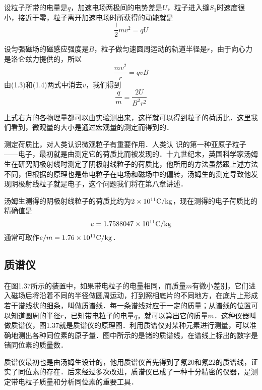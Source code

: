 设粒子所带的电量是$q$，加速电场两极间的电势差是$U$，粒子进入缝$S_1$时速度很小，接近于零，粒子离开加速电场时所获得的动能就是
\begin{equation}
\frac{1}{2}mv^2=qU    
\end{equation}

设匀强磁场的磁感应强度是$B$，粒子做匀速圆周运动的轨道半径是$r$，由于向心力是洛仑兹力提供的，所以
\begin{equation}
    \frac{mv^2}{r}=qvB
\end{equation}
由(1.3)和(1.4)两式中消去$v$，我们得到
\[\frac{q}{m}=\frac{2U}{B^2r^2}\]

上式右方的各物理量都可以由实验测出来，这样就可以得到粒子的荷质比．这里我们看到，微观量的大小是通过宏观量的测定而得到的．

测定荷质比，对人类认识微观粒子有重要作用．人类认
识的第一种亚原子粒子——电子，最初就是由测定它的荷质比而被发现的．十九世纪末，英国科学家汤姆生在研究阴极射线时测定了阴极射线粒子的荷质比，他所用的方法虽然跟上述方法不同，但根据的原理也是带电粒子在电场和磁场中的偏转，汤姆生的测定导致他发现阴极射线粒子就是电子，这个问题我们将在第八章讲述．

汤姆生测得的阴极射线粒子的荷质比约为$2\times10^{11}{\rm C}/{\rm kg}$，现在测得的电子荷质比的精确值是
\[e=1.7588047\times10^{11}{\rm C}/{\rm kg}\]
通常可取作$e/m=1.76\times10^{11}{\rm C}/{\rm kg}$．

\subsection{质谱仪}

在图1.37所示的装置中，如果带电粒子的电量相同，而质量$m$有微小差别，它们进入磁场后将沿着不同的半径做圆周运动，打到照相底片的不同地方，在底片上形成若干谱线状的细条，叫做质谱线．每一条谱线对应于一定的质量；从谱线的位置可以知道圆周的半径$r$，已知带电粒子的电量$q$，就可以算出它的质量$m$．这种仪器叫做质谱仪，图1.37就是质谱仪的原理图．利用质谱仪对某种元素进行测量，可以准确地测出各种同位素的原子量．图中所示的是锗的质谱线，在谱线上标出的数字是锗同位素的质量数．

质谱仪最初也是由汤姆生设计的，他用质谱仪首先得到了氖20和氖22的质谱线，证实了同位素的存在．后来经过多次改进，质谱仪已成了一种十分精密的仪器，是测定带电粒子质量和分析同位素的重要工具．


